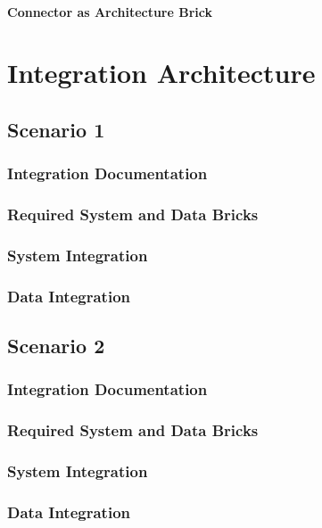 \documentclass[
     12pt,         %
     a4paper,      %
     BCOR10mm,     %
     DIV14,        %
aragraph skip instad of paragraph indent
     ]{scrreprt}
\begin{document}
\subsubsection{Connector as Architecture Brick}


\chapter{Integration Architecture}

\section{Scenario 1}

\subsection{Integration Documentation}

\subsection{Required System and Data Bricks}

\subsection{System Integration}

\subsection{Data Integration}

\section{Scenario 2}

\subsection{Integration Documentation}

\subsection{Required System and Data Bricks}

\subsection{System Integration}

\subsection{Data Integration}
\end{document}
